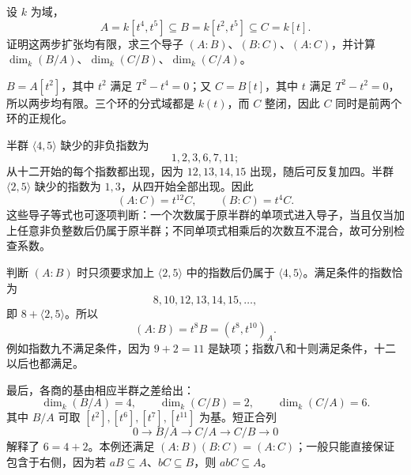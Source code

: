 \begin{exercise}\label{g5:ex:intermediate-normalization-conductors}
	设 \(k\) 为域，
	\[
		A=k[t^4,t^5]\subseteq B=k[t^2,t^5]\subseteq C=k[t].
	\]
	证明这两步扩张均有限，求三个导子 \((A:B)\)、\((B:C)\)、\((A:C)\)，并计算
	\(\dim_k(B/A)\)、\(\dim_k(C/B)\)、\(\dim_k(C/A)\)。
\end{exercise}
\begin{solution}
	\(B=A[t^2]\)，其中 \(t^2\) 满足 \(T^2-t^4=0\)；又 \(C=B[t]\)，其中 \(t\) 满足 \(T^2-t^2=0\)，所以两步均有限。三个环的分式域都是 \(k(t)\)，而 \(C\) 整闭，因此 \(C\) 同时是前两个环的正规化。

	半群 \(\langle4,5\rangle\) 缺少的非负指数为
	\[
		1,2,3,6,7,11;
	\]
	从十二开始的每个指数都出现，因为 \(12,13,14,15\) 出现，随后可反复加四。半群 \(\langle2,5\rangle\) 缺少的指数为 \(1,3\)，从四开始全部出现。因此
	\[
		(A:C)=t^{12}C,\qquad (B:C)=t^4C.
	\]
	这些导子等式也可逐项判断：一个次数属于原半群的单项式进入导子，当且仅当加上任意非负整数后仍属于原半群；不同单项式相乘后的次数互不混合，故可分别检查系数。

	判断 \((A:B)\) 时只须要求加上 \(\langle2,5\rangle\) 中的指数后仍属于 \(\langle4,5\rangle\)。满足条件的指数恰为
	\[
		8,10,12,13,14,15,\ldots,
	\]
	即 \(8+\langle2,5\rangle\)。所以
	\[
		(A:B)=t^8B=(t^8,t^{10})_A.
	\]
	例如指数九不满足条件，因为 \(9+2=11\) 是缺项；指数八和十则满足条件，十二以后也都满足。

	最后，各商的基由相应半群之差给出：
	\[
		\dim_k(B/A)=4,\qquad
		\dim_k(C/B)=2,\qquad
		\dim_k(C/A)=6.
	\]
	其中 \(B/A\) 可取 \([t^2],[t^6],[t^7],[t^{11}]\) 为基。短正合列
	\[
		0\longrightarrow B/A\longrightarrow C/A
		\longrightarrow C/B\longrightarrow0
	\]
	解释了 \(6=4+2\)。本例还满足
	\((A:B)(B:C)=(A:C)\)；一般只能直接保证包含于右侧，因为若 \(aB\subseteq A\)、\(bC\subseteq B\)，则 \(abC\subseteq A\)。
\end{solution}
